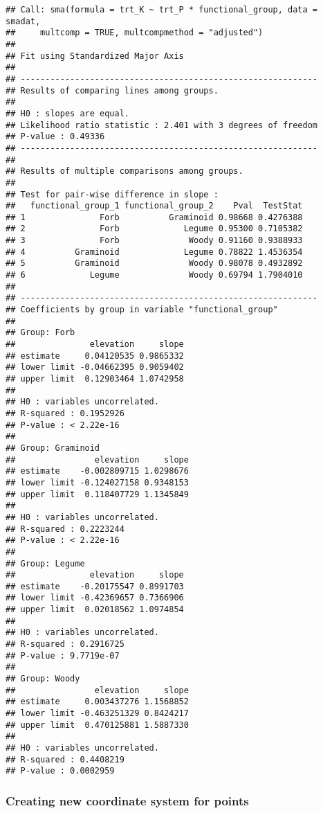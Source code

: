 \documentclass[]{article}
\begin{document}
\begin{verbatim}
## Call: sma(formula = trt_K ~ trt_P * functional_group, data = smadat, 
##     multcomp = TRUE, multcompmethod = "adjusted") 
## 
## Fit using Standardized Major Axis 
## 
## ------------------------------------------------------------
## Results of comparing lines among groups.
## 
## H0 : slopes are equal.
## Likelihood ratio statistic : 2.401 with 3 degrees of freedom
## P-value : 0.49336 
## ------------------------------------------------------------
## 
## Results of multiple comparisons among groups.
## 
## Test for pair-wise difference in slope :
##   functional_group_1 functional_group_2    Pval  TestStat
## 1               Forb          Graminoid 0.98668 0.4276388
## 2               Forb             Legume 0.95300 0.7105382
## 3               Forb              Woody 0.91160 0.9388933
## 4          Graminoid             Legume 0.78822 1.4536354
## 5          Graminoid              Woody 0.98078 0.4932892
## 6             Legume              Woody 0.69794 1.7904010
## 
## ------------------------------------------------------------
## Coefficients by group in variable "functional_group"
## 
## Group: Forb 
##               elevation     slope
## estimate     0.04120535 0.9865332
## lower limit -0.04662395 0.9059402
## upper limit  0.12903464 1.0742958
## 
## H0 : variables uncorrelated.
## R-squared : 0.1952926 
## P-value : < 2.22e-16 
## 
## Group: Graminoid 
##                elevation     slope
## estimate    -0.002809715 1.0298676
## lower limit -0.124027158 0.9348153
## upper limit  0.118407729 1.1345849
## 
## H0 : variables uncorrelated.
## R-squared : 0.2223244 
## P-value : < 2.22e-16 
## 
## Group: Legume 
##               elevation     slope
## estimate    -0.20175547 0.8991703
## lower limit -0.42369657 0.7366906
## upper limit  0.02018562 1.0974854
## 
## H0 : variables uncorrelated.
## R-squared : 0.2916725 
## P-value : 9.7719e-07 
## 
## Group: Woody 
##                elevation     slope
## estimate     0.003437276 1.1568852
## lower limit -0.463251329 0.8424217
## upper limit  0.470125881 1.5887330
## 
## H0 : variables uncorrelated.
## R-squared : 0.4408219 
## P-value : 0.0002959
\end{verbatim}

\hypertarget{creating-new-coordinate-system-for-points}{%
\subsubsection{Creating new coordinate system for
points}\label{creating-new-coordinate-system-for-points}}
\end{document}
